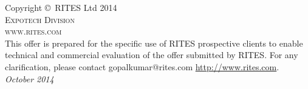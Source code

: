 \noindent Copyright \copyright\ RITES Ltd 2014\\ %

\noindent \textsc{Expotech Division}\\ %

\noindent \textsc{www.rites.com}\\ %

\noindent This offer is prepared for the specific use of RITES prospective clients to enable technical and commercial evaluation of the offer submitted by RITES.
For any clarification, please contact gopalkumar@rites.com  \url{http://www.rites.com}.\\ %

\noindent \textit{October 2014} %

